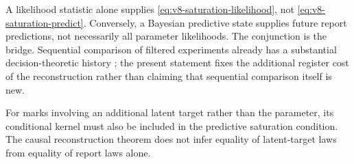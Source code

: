 A likelihood statistic alone supplies \eqref{eq:v8-saturation-likelihood},
not \eqref{eq:v8-saturation-predict}. Conversely, a Bayesian predictive
state supplies future report predictions, not necessarily all parameter
likelihoods. The conjunction is the bridge. Sequential comparison of
filtered experiments already has a substantial decision-theoretic
history \cite{Norberg2002}; the present statement fixes the additional
register cost of the reconstruction rather than claiming that sequential
comparison itself is new.

For marks involving an additional latent target rather than the parameter, its conditional kernel must also be included in the predictive saturation condition. The causal reconstruction theorem does not infer equality of latent-target laws from equality of report laws alone.
